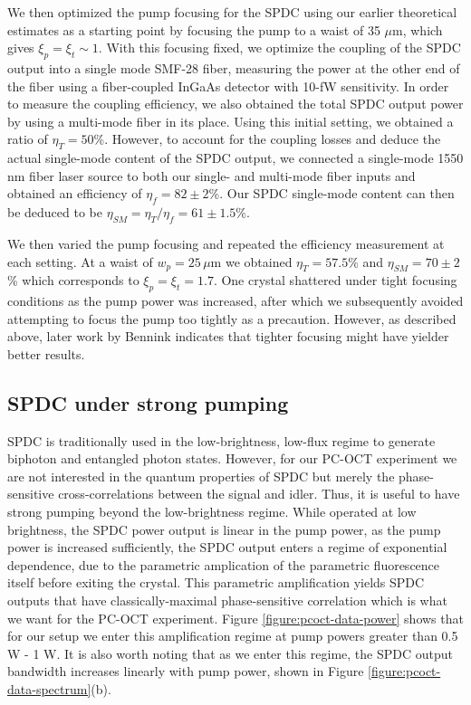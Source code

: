 We then optimized the pump focusing for the SPDC using our earlier theoretical estimates as a starting point by focusing the pump to a waist of 35 $\mu$m, which gives $\xi_p = \xi_t \sim 1$. With this focusing fixed, we optimize the coupling of the SPDC output into a single mode SMF-28 fiber, measuring the power at the other end of the fiber using a fiber-coupled InGaAs detector with 10-fW sensitivity. In order to measure the coupling efficiency, we also obtained the total SPDC output power by using a multi-mode fiber in its place. Using this initial setting, we obtained a ratio of $\eta_T = 50$\%. However, to account for the coupling losses and deduce the actual single-mode content of the SPDC output, we connected a single-mode 1550 nm fiber laser source to both our single- and multi-mode fiber inputs and obtained an efficiency of $\eta_{f} = 82 \pm 2$\%. Our SPDC single-mode content can then be deduced to be $\eta_{SM} = \eta_{T}/\eta_{f} = 61 \pm 1.5$\%.

We then varied the pump focusing and repeated the efficiency measurement at each setting. At a waist of $w_p = 25\,\mu$m we obtained $\eta_T = 57.5$\% and $\eta_{SM} = 70 \pm 2$\% which corresponds to $\xi_p = \xi_t = 1.7$. One crystal shattered under tight focusing conditions as the pump power was increased, after which we subsequently avoided attempting to focus the pump too tightly as a precaution. However, as described above, later work by Bennink \cite{bennink-optimal} indicates that tighter focusing might have yielder better results.

\subsection{SPDC under strong pumping}

SPDC is traditionally used in the low-brightness, low-flux regime to generate biphoton and entangled photon states. However, for our PC-OCT experiment we are not interested in the quantum properties of SPDC but merely the phase-sensitive cross-correlations between the signal and idler. Thus, it is useful to have strong pumping beyond the low-brightness regime. While operated at low brightness, the SPDC power output is linear in the pump power, as the pump power is increased sufficiently, the SPDC output enters a regime of exponential dependence, due to the parametric amplication of the parametric fluorescence itself before exiting the crystal. This parametric amplification yields SPDC outputs that have classically-maximal phase-sensitive correlation which is what we want for the PC-OCT experiment. Figure \ref{figure:pcoct-data-power} shows that for our setup we enter this amplification regime at pump powers greater than 0.5 W - 1 W. It is also worth noting that as we enter this regime, the SPDC output bandwidth increases linearly with pump power, shown in Figure \ref{figure:pcoct-data-spectrum}(b).



